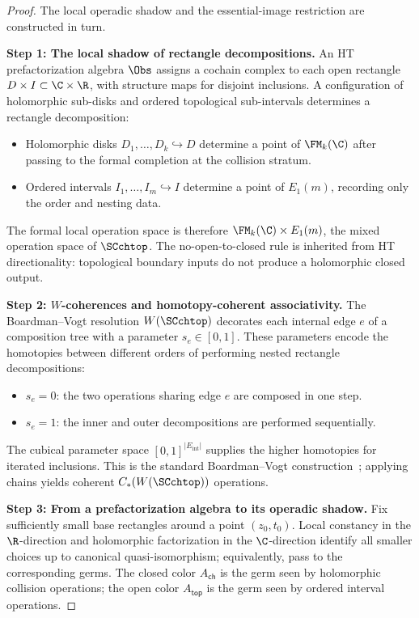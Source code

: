 \begin{proof}
The local operadic shadow and the essential-image restriction are
constructed in turn.

\medskip\noindent
\textbf{Step 1: The local shadow of rectangle decompositions.}
An HT prefactorization algebra $\Obs$ assigns a cochain complex to
each open rectangle $D \times I \subset \C \times \R$, with structure
maps for disjoint inclusions. A configuration of holomorphic
sub-disks and ordered topological sub-intervals determines a
rectangle decomposition:
\begin{itemize}
\item Holomorphic disks $D_1,\ldots,D_k\hookrightarrow D$ determine
 a point of $\FM_k(\C)$ after passing to the formal completion at the
 collision stratum.
\item Ordered intervals $I_1,\ldots,I_m\hookrightarrow I$ determine
 a point of $E_1(m)$, recording only the order and nesting data.
\end{itemize}
The formal local operation space is therefore
$\FM_k(\C)\times E_1(m)$, the mixed operation space of $\SCchtop$.
The no-open-to-closed rule is inherited from HT directionality:
topological boundary inputs do not produce a holomorphic closed
output.

\medskip\noindent
\textbf{Step 2: $W$-coherences and homotopy-coherent associativity.}
The Boardman--Vogt resolution $W(\SCchtop)$ decorates each internal
edge $e$ of a composition tree with a parameter $s_e\in[0,1]$. These
parameters encode the homotopies between different orders of
performing nested rectangle decompositions:
\begin{itemize}
\item $s_e=0$: the two operations sharing edge $e$ are composed in
 one step.
\item $s_e=1$: the inner and outer decompositions are performed
 sequentially.
\end{itemize}
The cubical parameter space $[0,1]^{|E_{\mathrm{int}}|}$ supplies the
higher homotopies for iterated inclusions. This is the standard
Boardman--Vogt construction~\cite{BV73}; applying chains yields
coherent $C_\ast(W(\SCchtop))$ operations.

\medskip\noindent
\textbf{Step 3: From a prefactorization algebra to its operadic shadow.}
Fix sufficiently small base rectangles around a point
$(z_0,t_0)$. Local constancy in the $\R$-direction and holomorphic
factorization in the $\C$-direction identify all smaller choices up
to canonical quasi-isomorphism; equivalently, pass to the
corresponding germs. The closed color $A_{\mathsf{ch}}$ is the germ
seen by holomorphic collision operations; the open color
$A_{\mathsf{top}}$ is the germ seen by ordered interval operations.


\end{proof}

